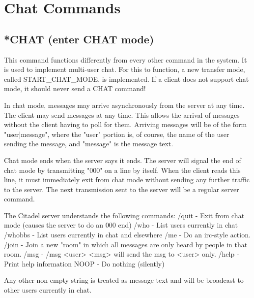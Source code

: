 \section{Chat Commands}



\subsection{*CHAT (enter CHAT mode)}

 This command functions differently from every other command in the system.  It
is used to implement multi-user chat.  For this to function, a new transfer
mode, called START_CHAT_MODE, is implemented.  If a client does not support
chat mode, it should never send a CHAT command!

 In chat mode, messages may arrive asynchronously from the server at any
time.  The client may send messages at any time.  This allows the arrival of
messages without the client having to poll for them.  Arriving messages will
be of the form  "user|message", where the "user" portion is, of course, the
name of the user sending the message, and "message" is the message text.

 Chat mode ends when the server says it ends.  The server will signal the end
of chat mode by transmitting "000" on a line by itself.  When the client reads
this line, it must immediately exit from chat mode without sending any
further traffic to the server.  The next transmission sent to the server
will be a regular server command.

 The Citadel server understands the following commands:
 /quit   -   Exit from chat mode (causes the server to do an 000 end)
 /who    -   List users currently in chat
 /whobbs -   List users currently in chat and elsewhere
 /me     -   Do an irc-style action.
 /join   -   Join a new "room" in which all messages are only heard by
             people in that room.
 /msg    -   /msg <user> <msg> will send the msg to <user> only.
 /help   -   Print help information
 NOOP    -   Do nothing (silently)

 Any other non-empty string is treated as message text and will be broadcast
to other users currently in chat.



